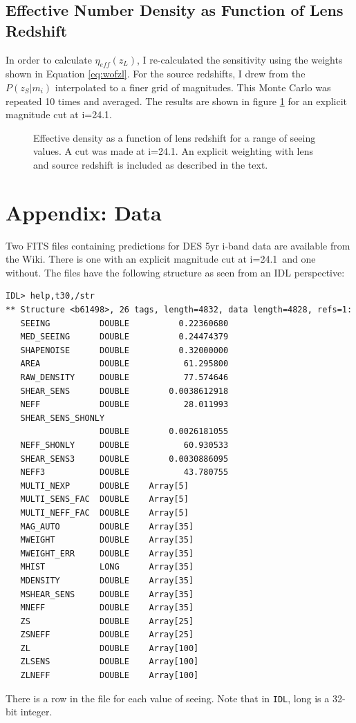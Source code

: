 \documentclass[12pt,preprint]{aastex}
\newcommand{\magcut}{24.1}
\begin{document}
\subsection{Effective Number Density as Function of Lens Redshift}

In order to calculate $\eta_{eff}(z_L)$, I re-calculated the sensitivity using
the weights shown in Equation \ref{eq:wofzl}.  For the source redshifts, I drew
from the $P(z_S|m_i)$ interpolated to a finer grid of magnitudes.  This Monte
Carlo was repeated 10 times and averaged.  The results are shown in figure
\ref{fig:neff-vs-zl} for an explicit magnitude cut at i=\magcut.

\begin{figure}

    \caption{Effective density as a function of lens redshift for a range of
    seeing values. A cut was made at i=\magcut.  An explicit weighting with
    lens and source redshift is included as described in the text.
    \label{fig:neff-vs-zl}} 
    
\end{figure}


\newpage
\appendix
\section{Appendix: Data}

Two FITS files containing predictions for DES 5yr i-band data are available
from the Wiki.  There is one with an explicit magnitude cut at i=\magcut\ and
one without.  The files have the following structure as seen from an IDL
perspective:
\begin{verbatim}
IDL> help,t30,/str
** Structure <b61498>, 26 tags, length=4832, data length=4828, refs=1:
   SEEING          DOUBLE          0.22360680
   MED_SEEING      DOUBLE          0.24474379
   SHAPENOISE      DOUBLE          0.32000000
   AREA            DOUBLE           61.295800
   RAW_DENSITY     DOUBLE           77.574646
   SHEAR_SENS      DOUBLE        0.0038612918
   NEFF            DOUBLE           28.011993
   SHEAR_SENS_SHONLY
                   DOUBLE        0.0026181055
   NEFF_SHONLY     DOUBLE           60.930533
   SHEAR_SENS3     DOUBLE        0.0030886095
   NEFF3           DOUBLE           43.780755
   MULTI_NEXP      DOUBLE    Array[5]
   MULTI_SENS_FAC  DOUBLE    Array[5]
   MULTI_NEFF_FAC  DOUBLE    Array[5]
   MAG_AUTO        DOUBLE    Array[35]
   MWEIGHT         DOUBLE    Array[35]
   MWEIGHT_ERR     DOUBLE    Array[35]
   MHIST           LONG      Array[35]
   MDENSITY        DOUBLE    Array[35]
   MSHEAR_SENS     DOUBLE    Array[35]
   MNEFF           DOUBLE    Array[35]
   ZS              DOUBLE    Array[25]
   ZSNEFF          DOUBLE    Array[25]
   ZL              DOUBLE    Array[100]
   ZLSENS          DOUBLE    Array[100]
   ZLNEFF          DOUBLE    Array[100]
\end{verbatim}
There is a row in the file for each value of seeing.  Note that in
\texttt{IDL}, long is a 32-bit integer.
\end{document}
